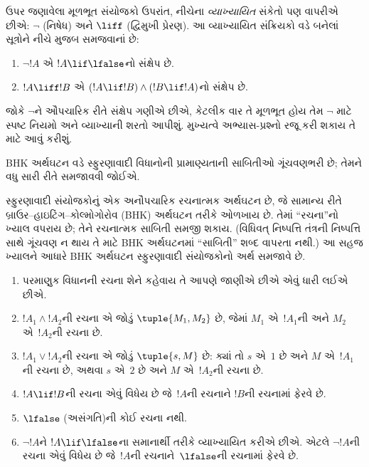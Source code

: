 ઉપર જણાવેલા મૂળભૂત સંયોજકો ઉપરાંત, નીચેના \emph{વ્યાખ્યાયિત}
સંકેતો પણ વાપરીએ છીએ: $\lnot$ (નિષેધ) અને $\liff$
(દ્વિમુખી પ્રેરણ). આ વ્યાખ્યાયિત સંક્રિયકો વડે બનેલાં
સૂત્રોને નીચે મુજબ સમજવાનાં છે:
\begin{enumerate}
\item $\lnot !A$ એ $!A \lif \lfalse$નો સંક્ષેપ છે.

\item $!A \liff !B$ એ $(!A \lif !B) \land (!B
  \lif !A)$નો સંક્ષેપ છે.
\end{enumerate}

જોકે $\lnot$ને ઔપચારિક રીતે સંક્ષેપ ગણીએ છીએ, કેટલીક વાર
તે મૂળભૂત હોય તેમ $\lnot$ માટે સ્પષ્ટ નિયમો અને વ્યાખ્યાની
શરતો આપીશું. મુખ્યત્વે અભ્યાસ-પ્રશ્નો રજૂ કરી શકાય તે માટે
આવું કરીશું.
\endgroup


\begingroup
\makeatletter{}\makeatother


\label{guunit:OLP-0495}


\begin{editorial}
  BHK અર્થઘટન વડે સ્ફુરણાવાદી વિધાનોની પ્રામાણ્યતાની
  સાબિતીઓ ગૂંચવણભરી છે; તેમને વધુ સારી રીતે સમજાવવી જોઈએ.
\end{editorial}

સ્ફુરણાવાદી સંયોજકોનું એક અનૌપચારિક રચનાત્મક અર્થઘટન છે, જે
સામાન્ય રીતે બ્રાઉર--હાઇટિંગ--કોલ્મોગોરોવ (BHK) અર્થઘટન તરીકે
ઓળખાય છે. તેમાં ``રચના''નો ખ્યાલ વપરાય છે; તેને રચનાત્મક
સાબિતી સમજી શકાય. (વિધિવત્ નિષ્પત્તિ તંત્રની
નિષ્પત્તિ સાથે ગૂંચવણ ન થાય તે માટે BHK અર્થઘટનમાં
``સાબિતી'' શબ્દ વાપરતા નથી.) આ સહજ ખ્યાલને આધારે BHK
અર્થઘટન સ્ફુરણાવાદી સંયોજકોનો અર્થ સમજાવે છે.

\begin{enumerate}
\item પરમાણુક વિધાનની રચના શેને કહેવાય તે આપણે જાણીએ છીએ એવું
  ધારી લઈએ છીએ.
\item $!A_1 \land !A_2$ની રચના એ જોડું $\tuple{M_1, M_2}$ છે,
  જેમાં $M_1$ એ~$!A_1$ની અને $M_2$ એ~$!A_2$ની રચના છે.
\item $!A_1 \lor !A_2$ની રચના એ જોડું $\tuple{s, M}$ છે:
  ક્યાં તો $s$ એ~$1$ છે અને $M$ એ~$!A_1$ની રચના છે, અથવા
  $s$ એ~$2$ છે અને $M$ એ~$!A_2$ની રચના છે.
\item $!A \lif !B$ની રચના એવું વિધેય છે જે~$!A$ની રચનાને
  $!B$ની રચનામાં ફેરવે છે.
\item $\lfalse$ (અસંગતિ)ની કોઈ રચના નથી.
\item $\lnot !A$ને $!A \lif \lfalse$ના સમાનાર્થી તરીકે
  વ્યાખ્યાયિત કરીએ છીએ. એટલે $\lnot !A$ની રચના એવું વિધેય છે
  જે~$!A$ની રચનાને~$\lfalse$ની રચનામાં ફેરવે છે.
\end{enumerate}

